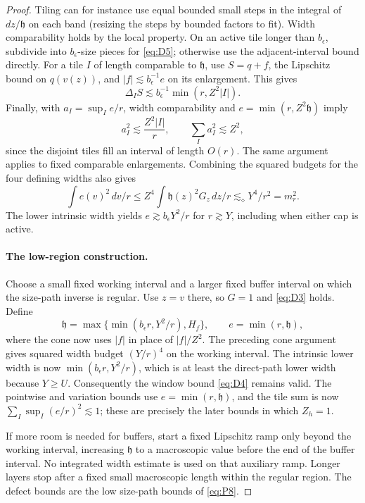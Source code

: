\begin{proof}
Tiling can for instance use equal bounded small steps in the integral of \(dz/\mathfrak h\) on each band (resizing the steps by bounded factors to fit). Width comparability holds by the local property. On an active tile longer than \(b_\epsilon\), subdivide into \(b_\epsilon\)-size pieces for \eqref{eq:D5}; otherwise use the adjacent-interval bound directly. For a tile $I$ of length comparable to $\mathfrak h$, use
$S=q+f$, the Lipschitz bound on $q(v(z))$, and
$|f|\lesssim b_\epsilon^{-1}e$ on its enlargement.  This gives
\[
 \Delta_I S\lesssim b_\epsilon^{-1}\min(r,Z^2|I|).
\]
Finally, with $a_I=\sup_I e/r$, width comparability and
$e=\min(r,Z^2\mathfrak h)$ imply
\[
 a_I^2\lesssim \frac{Z^2|I|}{r},\qquad
 \sum_I a_I^2\lesssim Z^2,
\]
since the disjoint tiles fill an interval of length $O(r)$.
The same argument applies to fixed comparable enlargements.
Combining the squared budgets for the four defining widths also gives
\[
 \int e(v)^2\,dv/r
 \le Z^4\int\mathfrak h(z)^2G_z\,dz/r
 \lesssim_\diamond Y^4/r^2=m_r^2.
\]
The lower intrinsic width yields $e\gtrsim b_\epsilon Y^2/r$ for
$r\gtrsim Y$, including when either cap is active.

\paragraph{The low-region construction.}
Choose a small fixed working interval and a larger fixed buffer
interval on which the size-path inverse is regular.  Use $z=v$ there,
so $G=1$ and \eqref{eq:D3} holds.  Define
\[
 \mathfrak h=\max\{\min(b_\epsilon r,Y^2/r),H_f\},
 \qquad e=\min(r,\mathfrak h),
\]
where the cone now uses $|f|$ in place of $|f|/Z^2$.
The preceding cone argument gives squared width budget $(Y/r)^4$
on the working interval.  The intrinsic lower width is now
$\min(b_\epsilon r,Y^2/r)$, which is at least the direct-path lower
width because $Y\ge U$.  Consequently the window bound
\eqref{eq:D4} remains valid.  The pointwise and variation bounds use
$e=\min(r,\mathfrak h)$, and the tile sum is now
$\sum_I\sup_I(e/r)^2\lesssim1$; these are precisely the later bounds
in which $Z_h=1$.

If more room is needed for buffers, start a fixed Lipschitz ramp only
beyond the working interval, increasing $\mathfrak h$ to a macroscopic
value before the end of the buffer interval.  No integrated width
estimate is used on that auxiliary ramp.  Longer layers stop after a
fixed small macroscopic length within the regular region.  The defect
bounds are the low size-path bounds of \eqref{eq:P8}.


\end{proof}
